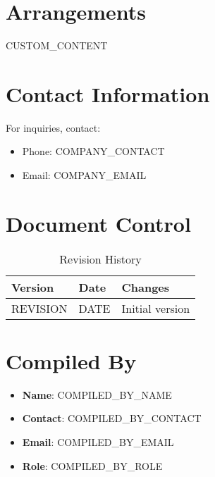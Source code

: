 \documentclass[12pt]{article}
\begin{document}
\section{Arrangements}
{{CUSTOM_CONTENT}}

\section{Contact Information}
For inquiries, contact:
\begin{itemize}
    \item Phone: {{COMPANY_CONTACT}}
    \item Email: {{COMPANY_EMAIL}}
\end{itemize}

\section{Document Control}
\begin{table}[h]
    \centering
    \begin{tabular}{p{3cm}p{3cm}p{6cm}}
        \toprule
        \textbf{Version} & \textbf{Date} & \textbf{Changes} \\
        \midrule
        {{REVISION}} & {{DATE}} & Initial version \\
        \bottomrule
    \end{tabular}
    \caption{Revision History}
\end{table}

\section{Compiled By}
\begin{itemize}
    \item \textbf{Name}: {{COMPILED_BY_NAME}}
    \item \textbf{Contact}: {{COMPILED_BY_CONTACT}}
    \item \textbf{Email}: {{COMPILED_BY_EMAIL}}
    \item \textbf{Role}: {{COMPILED_BY_ROLE}}
\end{itemize}
\end{document}
